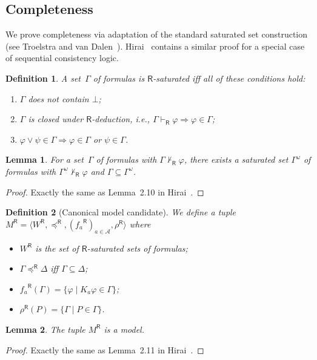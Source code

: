 \documentclass[doctor]{iscs-thesis}
\newcommand{\agents}{\mathcal A}
\newcommand{\tuple}[1]{\langle{#1}\rangle}
\newcommand{\vdashR}{\vdash_{\mathsf R}}
\newcommand{\R}[1]{{#1}^{\mathsf R}}
\newtheorem{definition}{Definition}
\newtheorem{lemma}{Lemma}
\begin{document}
\subsection{Completeness}
We prove completeness via
  adaptation of the standard saturated set construction (see Troelstra
  and van Dalen~\cite[Ch.~2]{troelstra1988constructivism}).
  Hirai~\cite{hirailpar} contains a similar proof for a special case of
  sequential consistency logic.

\begin{definition}
 A set~$\Gamma$ of formulas is
 $\mathsf R$-saturated iff all of these conditions hold:
 \begin{enumerate}
  \item $\Gamma$ does not contain $\bot$;
  \item $\Gamma$ is closed under $\mathsf R$-deduction, i.e.,
	$\Gamma\vdashR\varphi\Rightarrow\varphi\in\Gamma$;
  \item $\varphi\vee\psi\in\Gamma\Rightarrow\varphi\in\Gamma$ or $\psi\in\Gamma$.
 \end{enumerate}
\end{definition}

\begin{lemma}
 \label{saturation}
 For a set~$\Gamma$ of formulas with $\Gamma\not\vdashR\varphi$,
 there exists a
 saturated set $\Gamma^{\omega}$ of formulas with
 $\Gamma^{\omega}\not\vdashR\varphi$ and
 $\Gamma\subseteq \Gamma^{\omega}$.
\end{lemma}
\begin{proof}
 Exactly the same as Lemma~2.10 in Hirai~\cite{hirailpar}.
\end{proof}


\begin{definition}[Canonical model candidate]
 We define a tuple
 $\R M = \tuple{\R W, \R\preceq, (\R{f_a})_{a\in \agents}, \R\rho}$
 where
 \begin{itemize}
  \item $\R W$ is the set of $\mathsf R$-saturated sets of formulas;
  \item $\Gamma\R\preceq \Delta$ iff $\Gamma\subseteq\Delta$;
  \item $\R{f_a}(\Gamma) = \{\varphi\mid K_a\varphi\in\Gamma\}$;
  \item $\R\rho(P)=\{\Gamma\mid P\in \Gamma\}$.
 \end{itemize}
\end{definition}

\begin{lemma}
 The tuple $\R M$ is a model.
\end{lemma}
\begin{proof}
 Exactly the same as Lemma~2.11 in Hirai~\cite{hirailpar}.
\end{proof}
\end{document}
